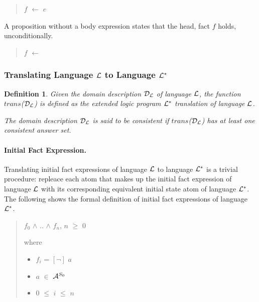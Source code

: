 \documentclass[10pt, twocolumn]{article}
\newtheorem{definition}{Definition}
\begin{document}
          \begin{quote}
            $f$ $\leftarrow$ $e$
          \end{quote}

          A proposition without a body expression states that the head, fact
          $f$ holds, unconditionally.

          \begin{quote}
            $f$ $\leftarrow$
          \end{quote}

      \subsubsection{Translating Language ${\cal L}$ to Language ${\cal L^{*}}$}

        \begin{definition}
          Given the domain description ${\cal D}_{\cal L}$ of language
          ${\cal L}$, the function $trans$(${\cal D}_{\cal L}$) is defined as
          the extended logic program ${\cal L}^{*}$ translation of language
          ${\cal L}$.

          The domain description ${\cal D}_{\cal L}$ is said to be
          {\em consistent} if $trans$(${\cal D}_{\cal L}$) has at least one
          consistent answer set. 
        \end{definition}

        \paragraph{Initial Fact Expression.}

          Translating initial fact expressions of language ${\cal L}$ to
          language ${\cal L}^{*}$ is a trivial procedure: repleace each atom
          that makes up the initial fact expression of language ${\cal L}$
          with its corresponding equivalent initial state atom of language
          ${\cal L}^{*}$. The following shows the formal definition of initial
          fact expressions of language ${\cal L}^{*}$.

          \begin{quote}
            $f_{0}$ $\land$ .. $\land$ $f_{n}$, $n$ $\geq$ $0$

            where

              \begin{itemize}
                \item
                  $f_{i}$ = $[\lnot]$ $a$
                \item
                  $a$ $\in$ ${\cal A}^{S_{0}}$
                \item
                  $0$ $\leq$ $i$ $\leq$ $n$
              \end{itemize}
          \end{quote}
\end{document}
